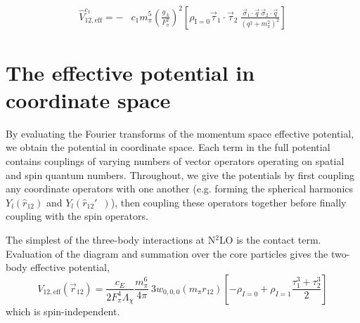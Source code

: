 \documentclass[%
 preprint,
 amsmath,amssymb,
 aps,
]{revtex4-1}
\newcommand{\veff}{\hat{V}_{12,\text{eff}}}
\newcommand{\rhozero}{\rho_{\text{I}=0}}
\newcommand{\rotphat}{\hat{r}_{12}\!\!\!\!'\,\,\,}
\newcommand{\tauplusthree}{\frac{\tau_1^3+\tau_2^3}{2}}
\newcommand{\w}[4]{w_{#1,#2,#3}(#4)}
\begin{document}
\begin{align}
 \veff^{c_1}=-&c_1 m_\pi^5\left(\frac{g_A}{F_\pi^2}\right)^2 \left[ \rhozero\vec{\tau}_1\cdot\vec{\tau}_2 \:\frac{\vec{\sigma}_1\cdot\vec{q}\:\vec{\sigma}_2\cdot\vec{q} }{\left(q^2+m_\pi^2\right)^2} \right]
\end{align}
 
\section{The effective potential in coordinate space}

By evaluating the Fourier transforms of the momentum space effective potential, we obtain the potential in coordinate space. Each term in the full potential contains couplings of varying numbers of vector operators operating on spatial and spin quantum numbers. Throughout, we give the potentials by first coupling any coordinate operators with one another (e.g. forming the spherical harmonics $Y_l(\hat{r}_{12})$ and $Y_l(\rotphat)$), then coupling these operators together before finally coupling with the spin operators.

The simplest of the three-body interactions at N$^2$LO is the contact term. Evaluation of the diagram and summation over the core particles gives the two-body effective potential,
\begin{equation}
V_{12,\text{eff}}(\vec{r}_{12})=\frac{c_E }{2F_\pi^4\Lambda_\chi}\frac{m_\pi^6}{4\pi}\:3\w{0}{0}{0}{m_\pi r_{12}}\left[-\rho_{I=0}+ \rho_{I=1}\tauplusthree \right]
\end{equation}
which is spin-independent.
\end{document}
